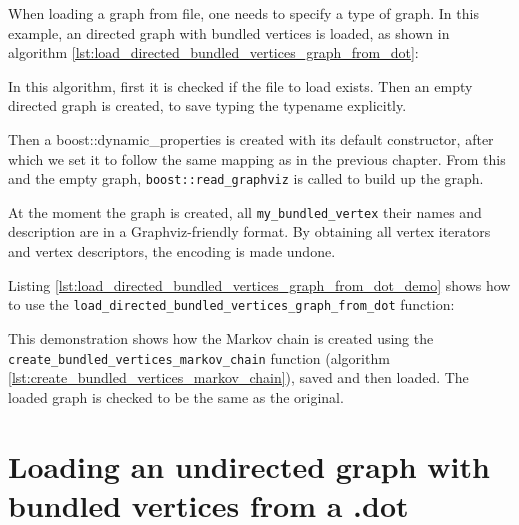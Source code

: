 When loading a graph from file, one needs to specify a type of graph.
In this example, an directed graph with bundled vertices is loaded, as
shown in algorithm \ref{lst:load_directed_bundled_vertices_graph_from_dot}:



In this algorithm, first it is checked if the file to load exists.
Then an empty directed graph is created, to save typing the typename explicitly.

Then a boost::dynamic_properties 
is created with its default constructor, after which we set it to follow
the same mapping as in the previous chapter.
From this and the empty graph, \verb;boost::read_graphviz;
is called to build up the graph.

At the moment the graph is created, all \verb;my_bundled_vertex; their names
and description are in a Graphviz-friendly format.
By obtaining all vertex iterators and vertex descriptors, the encoding
is made undone.

Listing \ref{lst:load_directed_bundled_vertices_graph_from_dot_demo}
shows how to use the \verb;load_directed_bundled_vertices_graph_from_dot; function:



This demonstration shows how the Markov chain is created using 
the \verb;create_bundled_vertices_markov_chain; function 
(algorithm \ref{lst:create_bundled_vertices_markov_chain}), 
saved and then loaded.
The loaded graph is checked to be the same as the original.

\section{Loading an undirected graph with bundled vertices from a .dot}
\label{subsec:load_undirected_bundled_vertices_graph_from_dot}

